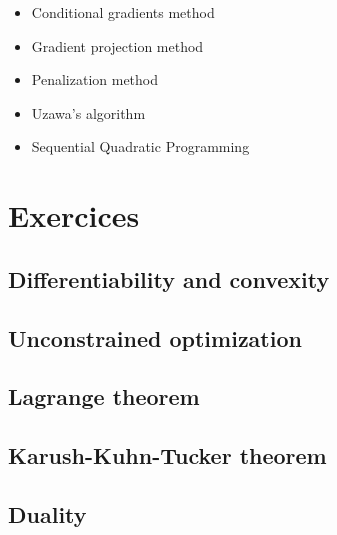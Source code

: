 \documentclass{article}
\begin{document}
\begin{itemize}
\item Conditional gradients method
\item Gradient projection method
\item Penalization method
\item Uzawa's algorithm
\item Sequential Quadratic Programming
\end{itemize}

\section{Exercices}

\subsection{Differentiability and convexity}

\subsection{Unconstrained optimization}

\subsection{Lagrange theorem}

\subsection{Karush-Kuhn-Tucker theorem}

\subsection{Duality}
\end{document}
